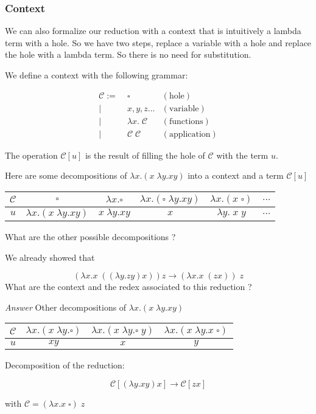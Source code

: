  \subsubsection{Context}

  We can also formalize our reduction with a context that is intuitively a
  lambda term with a hole. So we have two steps, replace a variable with a hole
  and replace the hole with a lambda term. So there is no need for substitution.

  We define a context with the following grammar:

  \begin{align*}
    \mathcal C :=&\; \square              & (\text{hole})\\
             |&\; x, y, z ...             & (\text{variable}) \\
             |&\; \lambda x.\; \mathcal C & (\text{functions}) \\
             |&\; \mathcal C\; \mathcal C & (\text{application})
  \end{align*}

  The operation $\mathcal C[u]$ is the result of filling the hole of $\mathcal
  C$ with the term $u$.

  \exo Here are some decompositions of $\lambda x.(x\; \lambda y.xy)$ into a
  context and a term $\mathcal C[u]$

  \begin{center}
  \begin{tabular}{c|c|c|c|c|c}
    $\mathcal C$ & $\square$ & $\lambda x.\square$ & $\lambda x.(\square\;
    \lambda y.xy)$ & $\lambda x.(x\; \square)$ & $\ldots$ \\
    \hline
    $u$ & $\lambda x.(x\; \lambda y.xy)$ & $x\; \lambda y.xy$ & $x$ & $\lambda
    y.\; x\;y$ & $\ldots$
  \end{tabular}
  \end{center}

  What are the other possible decompositions ?

  We already showed that

  \[
    (\lambda x.x\; ((\lambda y.zy)x))z \to (\lambda x.x\; (zx))\; z
  \]
  What are the context and the redex associated to this reduction ?

  \textit{Answer} Other decompositions of $\lambda x.(x\; \lambda y.xy)$

  \begin{center}
  \begin{tabular}{c|c|c|c|}
    $\mathcal C$ & $\lambda x.(x\; \lambda y.\square)$ & $\lambda x.(x\; \lambda
    y.\square\; y)$ & $\lambda x.(x\; \lambda y. x\; \square)$ \\
    \hline
    $u$ & $xy$ & $x$ & $y$
  \end{tabular}
  \end{center}

  Decomposition of the reduction:

  \[
    \mathcal C[(\lambda y.xy)x] \to \mathcal C [zx]
  \]

  with $\mathcal C = (\lambda x.x\;\square)\;z$


